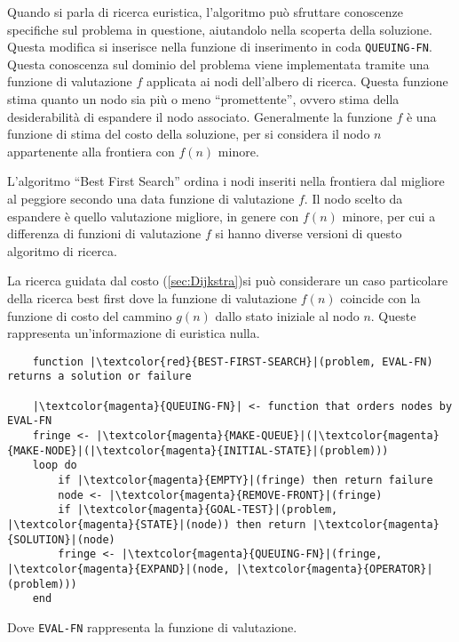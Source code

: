 \documentclass{article}
\numberwithin{equation}{subsection}
\begin{document}
Quando si parla di ricerca euristica, l'algoritmo può sfruttare conoscenze specifiche sul problema in questione, aiutandolo nella scoperta della soluzione. 
Questa modifica si inserisce nella funzione di inserimento in coda \color{magenta}\verb|QUEUING-FN|\color{black}. Questa conoscenza sul dominio del problema viene implementata tramite una funzione di valutazione $f$ 
applicata ai nodi dell'albero di ricerca. 
Questa funzione stima quanto un nodo sia più o meno ``promettente'', ovvero stima della desiderabilità di espandere il nodo associato. Generalmente la funzione $f$ è 
una funzione di stima del costo della soluzione, per si considera il nodo $n$ appartenente alla frontiera con $f(n)$ minore. 

L'algoritmo ``Best First Search'' ordina i nodi inseriti nella frontiera dal migliore al peggiore secondo una data funzione di valutazione $f$. Il nodo scelto da espandere 
è quello valutazione migliore, in genere con $f(n)$ minore, per cui a differenza di funzioni di valutazione $f$ si hanno diverse versioni di questo algoritmo di ricerca. 

La ricerca guidata dal costo (\ref{sec:Dijkstra})si può considerare un caso particolare della ricerca best first dove la funzione di valutazione $f(n)$ coincide 
con la funzione di costo del cammino $g(n)$ dallo stato iniziale al nodo $n$. Queste rappresenta un'informazione di euristica nulla. 

\begin{verbatim}
    function |\textcolor{red}{BEST-FIRST-SEARCH}|(problem, EVAL-FN) returns a solution or failure
    
    |\textcolor{magenta}{QUEUING-FN}| <- function that orders nodes by EVAL-FN
    fringe <- |\textcolor{magenta}{MAKE-QUEUE}|(|\textcolor{magenta}{MAKE-NODE}|(|\textcolor{magenta}{INITIAL-STATE}|(problem)))
    loop do
        if |\textcolor{magenta}{EMPTY}|(fringe) then return failure
        node <- |\textcolor{magenta}{REMOVE-FRONT}|(fringe)
        if |\textcolor{magenta}{GOAL-TEST}|(problem, |\textcolor{magenta}{STATE}|(node)) then return |\textcolor{magenta}{SOLUTION}|(node)
        fringe <- |\textcolor{magenta}{QUEUING-FN}|(fringe, |\textcolor{magenta}{EXPAND}|(node, |\textcolor{magenta}{OPERATOR}|(problem)))
    end
\end{verbatim}

Dove \verb|EVAL-FN| rappresenta la funzione di valutazione. 
\end{document}
